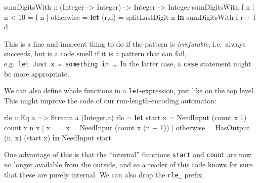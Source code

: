 \documentclass[11pt,
  american,
  DIV13]{article}
\newenvironment{Shaded}{}{}
\newcommand{\DataTypeTok}[1]{\textcolor[rgb]{0.56,0.13,0.00}{#1}}
\newcommand{\DecValTok}[1]{\textcolor[rgb]{0.25,0.63,0.44}{#1}}
\newcommand{\FunctionTok}[1]{\textcolor[rgb]{0.02,0.16,0.49}{#1}}
\newcommand{\KeywordTok}[1]{\textcolor[rgb]{0.00,0.44,0.13}{\textbf{#1}}}
\newcommand{\NormalTok}[1]{#1}
\newcommand{\OperatorTok}[1]{\textcolor[rgb]{0.40,0.40,0.40}{#1}}
\newcommand{\OtherTok}[1]{\textcolor[rgb]{0.00,0.44,0.13}{#1}}
\begin{document}
\begin{Shaded}
\begin{Highlighting}[]
\OtherTok{sumDigitsWith ::}\NormalTok{ (}\DataTypeTok{Integer} \OtherTok{{-}\textgreater{}} \DataTypeTok{Integer}\NormalTok{) }\OtherTok{{-}\textgreater{}} \DataTypeTok{Integer} \OtherTok{{-}\textgreater{}} \DataTypeTok{Integer}
\NormalTok{sumDigitsWith f n}
  \OperatorTok{|}\NormalTok{ n }\OperatorTok{\textless{}} \DecValTok{10} \OtherTok{=}\NormalTok{ f n}
  \OperatorTok{|} \FunctionTok{otherwise} \OtherTok{=}
    \KeywordTok{let}\NormalTok{ (r,d) }\OtherTok{=}\NormalTok{ splitLastDigit n}
    \KeywordTok{in}\NormalTok{ sumDigitsWith f r }\OperatorTok{+}\NormalTok{ f d}
\end{Highlighting}
\end{Shaded}

This is a fine and innocent thing to do if the pattern is
\emph{irrefutable}, i.e.~always succeeds, but is a code smell if it is a
pattern that can fail,
e.g.~\texttt{let\ Just\ x\ =\ something\ in\ \ldots{}}. In the latter
case, a \texttt{case} statement might be more appropriate.

We can also define whole functions in a \texttt{let}-expression, just
like on the top level. This might improve the code of our
run-length-encoding automaton:

\begin{Shaded}
\begin{Highlighting}[]
\OtherTok{rle ::} \DataTypeTok{Eq}\NormalTok{ a }\OtherTok{=\textgreater{}} \DataTypeTok{Stream}\NormalTok{ a (}\DataTypeTok{Integer}\NormalTok{,a)}
\NormalTok{rle }\OtherTok{=}
  \KeywordTok{let}\NormalTok{ start x }\OtherTok{=} \DataTypeTok{NeedInput}\NormalTok{ (count x }\DecValTok{1}\NormalTok{)}
\NormalTok{      count x n x\textquotesingle{} }\OperatorTok{|}\NormalTok{ x }\OperatorTok{==}\NormalTok{ x\textquotesingle{} }\OtherTok{=} \DataTypeTok{NeedInput}\NormalTok{ (count x (n }\OperatorTok{+} \DecValTok{1}\NormalTok{))}
                   \OperatorTok{|} \FunctionTok{otherwise} \OtherTok{=} \DataTypeTok{HasOutput}\NormalTok{ (n, x) (start x\textquotesingle{})}
  \KeywordTok{in} \DataTypeTok{NeedInput}\NormalTok{ start}
\end{Highlighting}
\end{Shaded}

One advantage of this is that the ``internal'' functions \texttt{start}
and \texttt{count} are now no longer available from the outside, and so
a reader of this code knows for sure that these are purely internal. We
can also drop the \texttt{rle\_} prefix.
\end{document}
